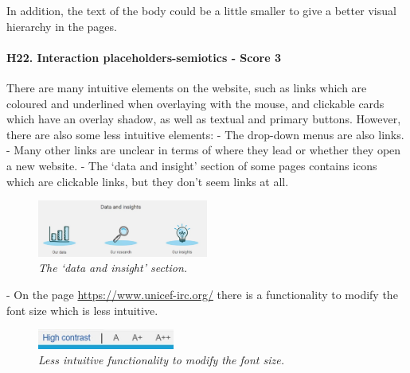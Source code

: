 \newline In addition, the text of the body could be a little smaller to give a better visual hierarchy in the pages.
\newline
\newline \paragraph{H22. Interaction placeholders-semiotics - Score 3}  \label{subsec:H22}	There are many intuitive elements on the website, such as links which are coloured and underlined when overlaying with the mouse, and clickable cards which have an overlay shadow, as well as textual and primary buttons.
\newline However, there are also some less intuitive elements:
\newline -	The drop-down menus are also links.
\newline -	Many other links are unclear in terms of where they lead or whether they open a new website.
\newline -	The ‘data and insight’ section of some pages contains icons which are clickable links, but they don’t seem links at all.
\begin{figure}[!h]
	\begin{center}
		\includegraphics[width=0.5\textwidth]{FinalScores25.jpg}
		\captionsetup{font=small}
		\caption{\textit{The ‘data and insight’ section.}}
	\end{center}
\end{figure}
\newline -	On the page \href{https://www.unicef-irc.org/}{https://www.unicef-irc.org/} there is a functionality to modify the font size which is less intuitive.
\begin{figure}[!h]
	\begin{center}
		\includegraphics[width=0.4\textwidth]{FinalScores26.jpg}
		\captionsetup{font=small}
		\caption{\textit{Less intuitive functionality to modify the font size.}}
	\end{center}
\end{figure}
\newline
